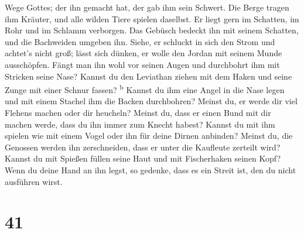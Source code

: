 Wege Gottes; der ihn gemacht hat, der gab ihm sein Schwert.
 Die Berge tragen ihm Kräuter, und alle wilden Tiere
spielen daselbst.  Er liegt gern im Schatten, im Rohr und
im Schlamm verborgen.  Das Gebüsch bedeckt ihn mit seinem
Schatten, und die Bachweiden umgeben ihn.  Siehe, er
schluckt in sich den Strom und achtet's nicht groß; lässt sich dünken,
er wolle den Jordan mit seinem Munde ausschöpfen.  Fängt
man ihn wohl vor seinen Augen und durchbohrt ihm mit Stricken seine
Nase?  Kannst du den Leviathan ziehen mit dem Haken und
seine Zunge mit einer Schnur fassen? \textsuperscript{b} 
Kannst du ihm eine Angel in die Nase legen und mit einem Stachel ihm die
Backen durchbohren?  Meinst du, er werde dir viel Flehens
machen oder dir heucheln?  Meinst du, dass er einen Bund
mit dir machen werde, dass du ihn immer zum Knecht habest?
 Kannst du mit ihm spielen wie mit einem Vogel oder ihn
für deine Dirnen anbinden?  Meinst du, die Genossen
werden ihn zerschneiden, dass er unter die Kaufleute zerteilt wird?
 Kannst du mit Spießen füllen seine Haut und mit
Fischerhaken seinen Kopf?  Wenn du deine Hand an ihn
legst, so gedenke, dass es ein Streit ist, den du nicht ausführen wirst.

\hypertarget{section-40}{%
\section{41}\label{section-40}}

